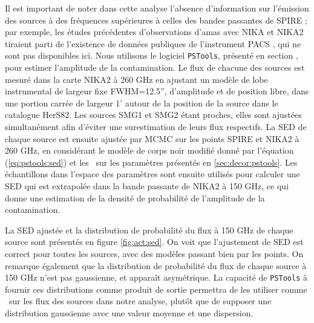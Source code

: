 Il est important de noter dans cette analyse l'absence d'information sur l'émission des sources à des fréquences supérieures à celles des bandes passantes de SPIRE ; par exemple, les études précédentes d'observations d'amas avec NIKA et NIKA2 tiraient parti de l'existence de données publiques de l'instrument PACS \cite{poglitsch_photodetector_2010}, qui ne sont pas disponibles ici.
Nous utilisons le logiciel \texttt{PSTools}, présenté en section , pour estimer l'amplitude de la contamination.
Le flux de chacune des sources est mesuré dans la carte NIKA2 à 260 GHz en ajustant un modèle de lobe instrumental de largeur fixe FWHM=12.5'', d'amplitude et de position libre, dans une portion carrée de largeur 1' autour de la position de la source dans le catalogue HerS82.
Les sources SMG1 et SMG2 étant proches, elles sont ajustées simultanément afin d'éviter une surestimation de leurs flux respectifs.
La SED de chaque source est ensuite ajustée par MCMC sur les points SPIRE et NIKA2 à 260 GHz, en considérant le modèle de corps noir modifié donné par l'équation (\ref{eq:pstools:sed}) et les \prior\ sur les paramètres présentés en \ref{sec:decor:pstools}.
Les échantillons dans l'espace des paramètres sont ensuite utilisés pour calculer une SED qui est extrapolée dans la bande passante de NIKA2 à 150 GHz, ce qui donne une estimation de la densité de probabilité de l'amplitude de la contamination.

La SED ajustée et la distribution de probabilité du flux à 150 GHz de chaque source sont présentés en figure \ref{fig:act:sed}.
On voit que l'ajustement de SED est correct pour toutes les sources, avec des modèles passant bien par les points.
On remarque également que la distribution de probabilité du flux de chaque source à 150 GHz n'est pas gaussienne, et apparaît asymétrique.
La capacité de \texttt{PSTools} à fournir ces distributions comme produit de sortie permettra de les utiliser comme \prior\ sur les flux des sources dans notre analyse, plutôt que de supposer une distribution gaussienne avec une valeur moyenne et une dispersion.

